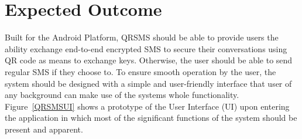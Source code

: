 \documentclass[journal]{./IEEE/IEEEtran}
\begin{document}
\section{Expected Outcome}
Built for the Android Platform, QRSMS should be able to provide
users the ability exchange end-to-end encrypted SMS to secure their
conversations using QR code as means to exchange keys.
Otherwise, the user should be able to send regular SMS if they choose to.
To ensure smooth operation by the user, the system should be designed
with a simple and user-friendly interface that user of any background
can make use of the systems whole functionality. Figure~\ref{QRSMSUI} shows a
prototype of the User Interface (UI) upon entering the application
in which most of the significant functions of the system should be present
and apparent.



%





\end{document}
